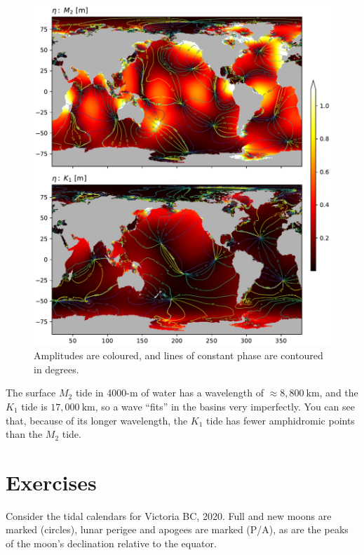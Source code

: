 \begin{figure}[hbt]
  \begin{center}
    \includegraphics[width=5in]{figs/Waves/TidalAmplitudes}
    \caption{Amplitudes are coloured, and lines of constant phase are contoured in degrees. }
    \label{fig:TidalAmplitudes}  
  \end{center}
\end{figure}

The surface $M_2$ tide in 4000-m of water has a wavelength of $\approx8,800\ \mathrm{km}$, and the $K_1$ tide is $17,000\ \mathrm{km}$, so a wave ``fits'' in the basins very imperfectly.  You can see that, because of its longer wavelength, the $K_1$ tide has fewer amphidromic points than the $M_2$ tide.  
\clearpage

\section{Exercises}

Consider the tidal calendars for Victoria BC, 2020.  Full and new moons are marked (circles), lunar perigee and apogees are marked (P/A), as are the peaks of the moon's declination relative to the equator.  


